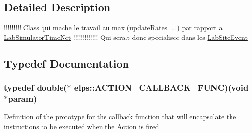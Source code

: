 \subsection{Detailed Description}
!!!!!!!!! Class qui mache le travail au max (update\+Rates, ...) par rapport a \hyperlink{classelps_1_1_lab_simulator_time_net}{Lab\+Simulator\+Time\+Net} !!!!!!!!!!!!! Qui serait donc specialisee dans les \hyperlink{classelps_1_1_lab_site_event}{Lab\+Site\+Event} 

\subsection{Typedef Documentation}
\hypertarget{namespaceelps_a61544f8fd8d17655cb55e58582a8a503}{
\subsubsection[{A\+C\+T\+I\+O\+N\+\_\+\+C\+A\+L\+L\+B\+A\+C\+K\+\_\+\+F\+U\+N\+C}]{\setlength{\rightskip}{0pt plus 5cm}typedef double($\ast$ elps\+::\+A\+C\+T\+I\+O\+N\+\_\+\+C\+A\+L\+L\+B\+A\+C\+K\+\_\+\+F\+U\+N\+C)(void $\ast$param)}}\label{namespaceelps_a61544f8fd8d17655cb55e58582a8a503}
Definition of the prototype for the callback function that will encapsulate the instructions to be executed when the Action is fired


